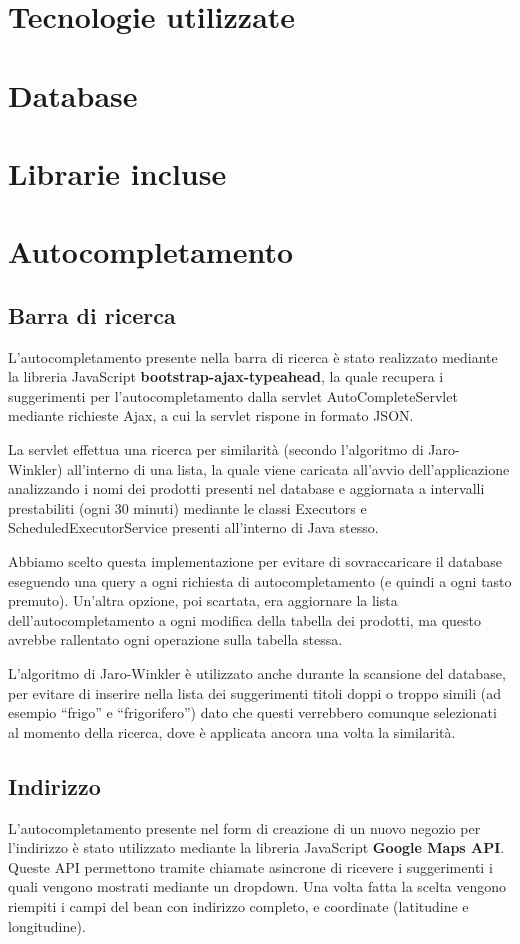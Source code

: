 
\chapter{Tecnologie utilizzate}
\lipsum
\chapter{Database}

\chapter{Librarie incluse}


\chapter{Autocompletamento}

\section{Barra di ricerca}
L'autocompletamento presente nella barra di ricerca è stato realizzato mediante la libreria JavaScript  \textbf{bootstrap-ajax-typeahead}, la quale recupera i suggerimenti per l'autocompletamento dalla servlet AutoCompleteServlet mediante richieste Ajax, a cui la servlet rispone in formato JSON.

La servlet effettua una ricerca per similarità (secondo l'algoritmo di Jaro-Winkler) all'interno di una lista, la quale viene caricata all'avvio dell'applicazione analizzando i nomi dei prodotti presenti nel database e aggiornata a intervalli prestabiliti (ogni 30 minuti) mediante le classi Executors e ScheduledExecutorService presenti all'interno di Java stesso.

Abbiamo scelto questa implementazione per evitare di sovraccaricare il database eseguendo una query a ogni richiesta di autocompletamento (e quindi a ogni tasto premuto).
Un'altra opzione, poi scartata, era aggiornare la lista dell'autocompletamento a ogni modifica della tabella dei prodotti, ma questo avrebbe rallentato ogni operazione sulla tabella stessa.

L'algoritmo di Jaro-Winkler è utilizzato anche durante la scansione del database, per evitare di inserire nella lista dei suggerimenti titoli doppi o troppo simili (ad esempio ``frigo'' e ``frigorifero'') dato che questi verrebbero comunque selezionati al momento della ricerca, dove è applicata ancora una volta la similarità.

\section{Indirizzo}
L'autocompletamento presente nel form di creazione di un nuovo negozio per l'indirizzo è stato utilizzato mediante la libreria JavaScript \textbf{Google Maps API}. Queste API permettono tramite chiamate asincrone di ricevere i suggerimenti i quali vengono mostrati mediante un dropdown. Una volta fatta la scelta vengono riempiti i campi del bean con indirizzo completo, e coordinate (latitudine e longitudine).

